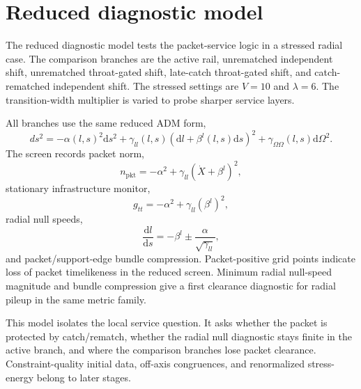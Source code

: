 \documentclass[11pt]{article}
\newcommand{\dd}{\mathrm{d}}
\newcommand{\pkt}{\mathrm{pkt}}
\begin{document}
\section{Reduced diagnostic model}

The reduced diagnostic model tests the packet-service logic in a stressed radial case. The comparison branches are the active rail, unrematched independent shift, unrematched throat-gated shift, late-catch throat-gated shift, and catch-rematched independent shift. The stressed settings are $V=10$ and $\lambda=6$. The transition-width multiplier is varied to probe sharper service layers.

All branches use the same reduced ADM form,
\begin{equation}
 ds^2=-\alpha(l,s)^2\dd s^2+\gamma_{ll}(l,s)(\dd l+\beta^l(l,s)\dd s)^2+\gamma_{\Omega\Omega}(l,s)\dd\Omega^2 .
\end{equation}
The screen records packet norm,
\begin{equation}
 n_{\pkt}=-\alpha^2+\gamma_{ll}\left(\dot X+\beta^l\right)^2,
\end{equation}
stationary infrastructure monitor,
\begin{equation}
 g_{tt}=-\alpha^2+\gamma_{ll}(\beta^l)^2,
\end{equation}
radial null speeds,
\begin{equation}
 \frac{\dd l}{\dd s}=-\beta^l\pm\frac{\alpha}{\sqrt{\gamma_{ll}}},
\end{equation}
and packet/support-edge bundle compression. Packet-positive grid points indicate loss of packet timelikeness in the reduced screen. Minimum radial null-speed magnitude and bundle compression give a first clearance diagnostic for radial pileup in the same metric family.

This model isolates the local service question. It asks whether the packet is protected by catch/rematch, whether the radial null diagnostic stays finite in the active branch, and where the comparison branches lose packet clearance. Constraint-quality initial data, off-axis congruences, and renormalized stress-energy belong to later stages.
\end{document}
